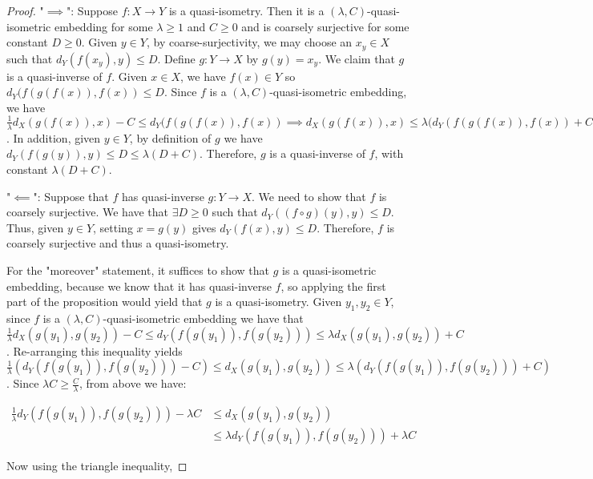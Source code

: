 \documentclass[12pt]{article}
\newcommand{\vs}{\vskip10pt}
\begin{document}
 	\begin{proof}
 		
 		"$\implies$": Suppose $f: X \rightarrow Y$ is a quasi-isometry. Then it is a $(\lambda, C)$-quasi-isometric embedding for some $\lambda \geq 1$ and $C \geq 0$ and is coarsely surjective for some constant $D \geq 0$. Given $y \in Y$, by coarse-surjectivity, we may choose an $x_y \in X$ such that $d_Y(f(x_y), y) \leq D$. Define $g: Y \rightarrow X$ by $g(y) = x_y$. We claim that $g$ is a quasi-inverse of $f$. Given $x \in X$, we have $f(x) \in Y$ so $d_Y(f(g(f(x)), f(x)) \leq D$. Since $f$ is a $(\lambda, C)$-quasi-isometric embedding, we have $\frac{1}{\lambda}d_X(g(f(x)), x) - C \leq d_Y(f(g(f(x)), f(x)) \implies d_X(g(f(x)), x) \leq \lambda(d_Y(f(g(f(x)), f(x)) + C) \leq \lambda(D + C)$. In addition, given $y \in Y$, by definition of $g$ we have $d_Y(f(g(y)), y) \leq D \leq \lambda(D + C)$. Therefore, $g$ is a quasi-inverse of $f$, with constant $\lambda(D + C)$. 
 		
 		\vs 
 		
 		"$\impliedby$": Suppose that $f$ has quasi-inverse $g: Y \rightarrow X$. We need to show that $f$ is coarsely surjective. We have that $\exists D \geq 0$ such that $d_Y((f \circ g)(y), y) \leq D$. Thus, given $y \in Y$, setting $x = g(y)$ gives $d_Y(f(x), y) \leq D$. Therefore, $f$ is coarsely surjective and thus a quasi-isometry. 
 		
 		\vs 
 		
 		For the "moreover" statement, it suffices to show that $g$ is a quasi-isometric embedding, because we know that it has quasi-inverse $f$, so applying the first part of the proposition would yield that $g$ is a quasi-isometry. 
 		\vs
 		Given $y_1, y_2 \in Y$, since $f$ is a $(\lambda, C)$-quasi-isometric embedding we have that $\frac{1}{\lambda} d_X(g(y_1), g(y_2)) - C \leq d_Y(f(g(y_1)), f(g(y_2))) \leq \lambda d_X(g(y_1), g(y_2)) + C$. Re-arranging this inequality yields $\frac{1}{\lambda} (d_Y(f(g(y_1)), f(g(y_2))) - C) \leq d_X(g(y_1), g(y_2)) \leq \lambda (d_Y(f(g(y_1)), f(g(y_2))) + C) $. Since $\lambda C \geq \frac{C}{\lambda}$, from above we have: 
 		
 		\begin{align*}
 		\frac{1}{\lambda} d_Y(f(g(y_1)), f(g(y_2))) - \lambda C &\leq d_X(g(y_1), g(y_2)) \\
 		&\leq \lambda d_Y(f(g(y_1)), f(g(y_2))) + \lambda C
 		\end{align*}
 		
 		Now using the triangle inequality,
 		

\end{proof}
\end{document}
